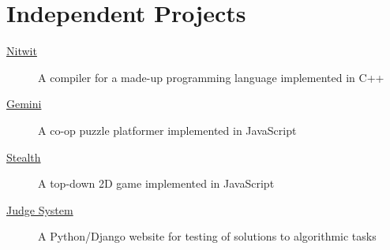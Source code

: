 \documentclass[letterpaper,11pt]{article}
\begin{document}
\section*{Independent Projects}
\begin{description}
    \item[\href{https://github.com/Alaxe/nitwit}{Nitwit}]
        A compiler for a made-up programming language implemented in C++
    \item[\href{https://github.com/Alaxe/gemini}{Gemini}]
        A co-op puzzle platformer implemented in JavaScript
    \item[\href{https://github.com/Alaxe/stealth}{Stealth}]
        A top-down 2D game implemented in JavaScript
    \item[\href{https://github.com/Alaxe/judgeSystem}{Judge System}]
        A Python/Django website for testing of solutions to algorithmic tasks
\end{description}
\end{document}
